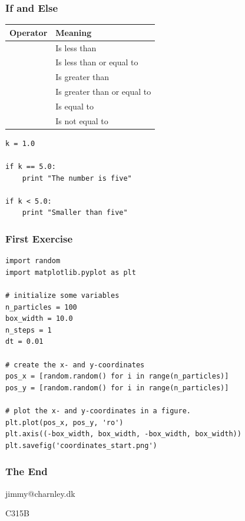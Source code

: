 \begin{frame}[fragile]

    \frametitle{If and Else}

    \centering

    \begin{tabular}{l l}

        \bf Operator & \bf Meaning \\

        \midrule

        \code{<}  & Is less than \\
        \code{<=} & Is less than or equal to \\
        \code{>}  & Is greater than \\
        \code{>=} & Is greater than or equal to \\
        \code{==} & Is equal to \\
        \code{!=} & Is not equal to\\

    \end{tabular}

    \bigskip

\begin{lstlisting}
k = 1.0

if k == 5.0:
    print "The number is five"

if k < 5.0:
    print "Smaller than five"

\end{lstlisting}


\end{frame}






\begin{frame}[fragile]

    \frametitle{First Exercise}

\begin{lstlisting}
import random
import matplotlib.pyplot as plt

# initialize some variables
n_particles = 100
box_width = 10.0
n_steps = 1
dt = 0.01

# create the x- and y-coordinates
pos_x = [random.random() for i in range(n_particles)]
pos_y = [random.random() for i in range(n_particles)]

# plot the x- and y-coordinates in a figure.
plt.plot(pos_x, pos_y, 'ro')
plt.axis((-box_width, box_width, -box_width, box_width))
plt.savefig('coordinates_start.png')

\end{lstlisting}


\end{frame}





\frame
{
    \frametitle{The End}

    \bigskip
    jimmy@charnley.dk

    \bigskip

    C315B

}








